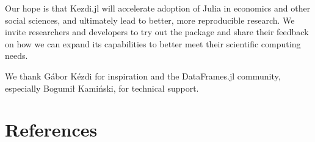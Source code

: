 \documentclass{juliacon}
\begin{document}
Our hope is that Kezdi.jl will accelerate adoption of Julia in economics and other social sciences, and ultimately lead to better, more reproducible research. We invite researchers and developers to try out the package and share their feedback on how we can expand its capabilities to better meet their scientific computing needs.

\backmatter


We thank Gábor Kézdi for inspiration and the DataFrames.jl community, especially Bogumił Kamiński, for technical support.

\section*{References}
\begingroup
\setlength{\parindent}{0pt}
\setlength{\parskip}{2pt}
\def\small{\small}




\endgroup
\end{document}
